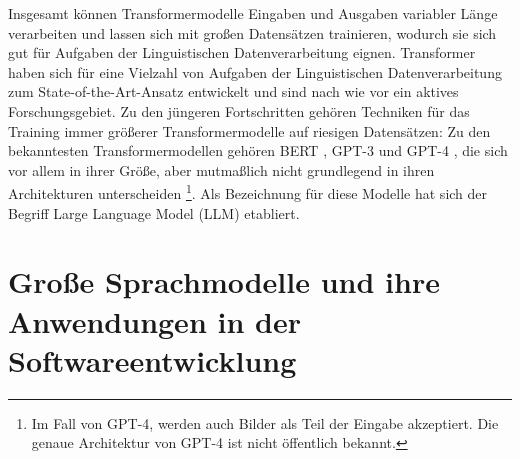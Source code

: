 Insgesamt können Transformermodelle Eingaben und Ausgaben variabler Länge verarbeiten und lassen sich mit großen Datensätzen trainieren, wodurch sie sich gut für Aufgaben der Linguistischen Datenverarbeitung eignen.
Transformer haben sich für eine Vielzahl von Aufgaben der Linguistischen Datenverarbeitung zum State-of-the-Art-Ansatz entwickelt und sind nach wie vor ein aktives Forschungsgebiet.
Zu den jüngeren Fortschritten gehören Techniken für das Training immer größerer Transformermodelle auf riesigen Datensätzen:
Zu den bekanntesten Transformermodellen gehören BERT \cite{bert}, GPT-3 \cite{FewShotLearners} und GPT-4 \cite{gpt4}, die sich vor allem in ihrer Größe, aber mutmaßlich nicht grundlegend in ihren Architekturen unterscheiden \footnote{Im Fall von GPT-4, werden auch Bilder als Teil der Eingabe akzeptiert. Die genaue Architektur von GPT-4 ist nicht öffentlich bekannt.}.
Als Bezeichnung für diese Modelle hat sich der Begriff Large Language Model (LLM) etabliert.

\section{Große Sprachmodelle und ihre Anwendungen in der Softwareentwicklung}
\label{subsec:Foundations:LLM}




